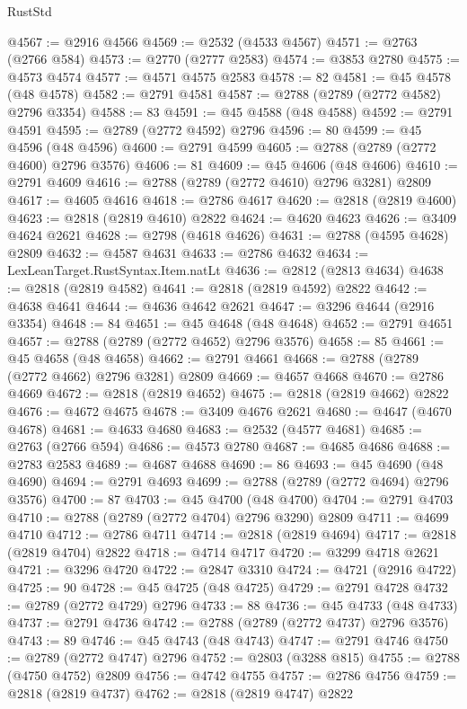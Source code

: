 \begin{lexlean}{RustStd}
\begin{coremodule}
@4567 := @2916 @4566
@4569 := @2532 (@4533 @4567)
@4571 := @2763 (@2766 @584)
@4573 := @2770 (@2777 @2583)
@4574 := @3853 @2780
@4575 := @4573 @4574
@4577 := @4571 @4575 @2583
@4578 := 82
@4581 := @45 @4578 (@48 @4578)
@4582 := @2791 @4581
@4587 := @2788 (@2789 (@2772 @4582) @2796 @3354)
@4588 := 83
@4591 := @45 @4588 (@48 @4588)
@4592 := @2791 @4591
@4595 := @2789 (@2772 @4592) @2796
@4596 := 80
@4599 := @45 @4596 (@48 @4596)
@4600 := @2791 @4599
@4605 := @2788 (@2789 (@2772 @4600) @2796 @3576)
@4606 := 81
@4609 := @45 @4606 (@48 @4606)
@4610 := @2791 @4609
@4616 := @2788 (@2789 (@2772 @4610) @2796 @3281) @2809
@4617 := @4605 @4616
@4618 := @2786 @4617
@4620 := @2818 (@2819 @4600)
@4623 := @2818 (@2819 @4610) @2822
@4624 := @4620 @4623
@4626 := @3409 @4624 @2621
@4628 := @2798 (@4618 @4626)
@4631 := @2788 (@4595 @4628) @2809
@4632 := @4587 @4631
@4633 := @2786 @4632
@4634 := LexLeanTarget.RustSyntax.Item.natLt
@4636 := @2812 (@2813 @4634)
@4638 := @2818 (@2819 @4582)
@4641 := @2818 (@2819 @4592) @2822
@4642 := @4638 @4641
@4644 := @4636 @4642 @2621
@4647 := @3296 @4644 (@2916 @3354)
@4648 := 84
@4651 := @45 @4648 (@48 @4648)
@4652 := @2791 @4651
@4657 := @2788 (@2789 (@2772 @4652) @2796 @3576)
@4658 := 85
@4661 := @45 @4658 (@48 @4658)
@4662 := @2791 @4661
@4668 := @2788 (@2789 (@2772 @4662) @2796 @3281) @2809
@4669 := @4657 @4668
@4670 := @2786 @4669
@4672 := @2818 (@2819 @4652)
@4675 := @2818 (@2819 @4662) @2822
@4676 := @4672 @4675
@4678 := @3409 @4676 @2621
@4680 := @4647 (@4670 @4678)
@4681 := @4633 @4680
@4683 := @2532 (@4577 @4681)
@4685 := @2763 (@2766 @594)
@4686 := @4573 @2780
@4687 := @4685 @4686
@4688 := @2783 @2583
@4689 := @4687 @4688
@4690 := 86
@4693 := @45 @4690 (@48 @4690)
@4694 := @2791 @4693
@4699 := @2788 (@2789 (@2772 @4694) @2796 @3576)
@4700 := 87
@4703 := @45 @4700 (@48 @4700)
@4704 := @2791 @4703
@4710 := @2788 (@2789 (@2772 @4704) @2796 @3290) @2809
@4711 := @4699 @4710
@4712 := @2786 @4711
@4714 := @2818 (@2819 @4694)
@4717 := @2818 (@2819 @4704) @2822
@4718 := @4714 @4717
@4720 := @3299 @4718 @2621
@4721 := @3296 @4720
@4722 := @2847 @3310
@4724 := @4721 (@2916 @4722)
@4725 := 90
@4728 := @45 @4725 (@48 @4725)
@4729 := @2791 @4728
@4732 := @2789 (@2772 @4729) @2796
@4733 := 88
@4736 := @45 @4733 (@48 @4733)
@4737 := @2791 @4736
@4742 := @2788 (@2789 (@2772 @4737) @2796 @3576)
@4743 := 89
@4746 := @45 @4743 (@48 @4743)
@4747 := @2791 @4746
@4750 := @2789 (@2772 @4747) @2796
@4752 := @2803 (@3288 @815)
@4755 := @2788 (@4750 @4752) @2809
@4756 := @4742 @4755
@4757 := @2786 @4756
@4759 := @2818 (@2819 @4737)
@4762 := @2818 (@2819 @4747) @2822

\end{coremodule}
\end{lexlean}
